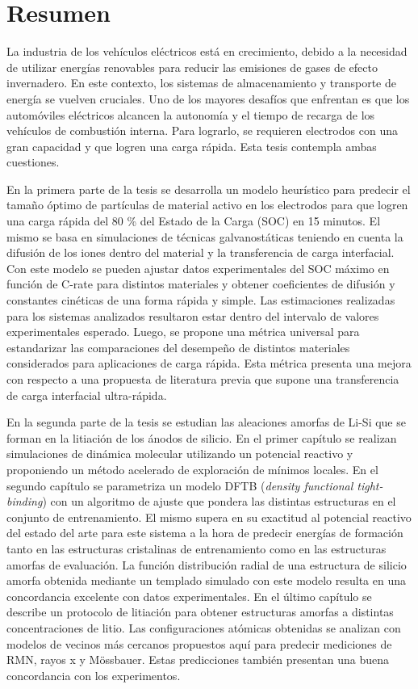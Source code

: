 \chapter{Resumen}

La industria de los vehículos eléctricos está en crecimiento, debido a la 
necesidad de utilizar energías renovables para reducir las emisiones de gases de 
efecto invernadero. En este contexto, los sistemas de almacenamiento y transporte 
de energía se vuelven cruciales. Uno de los mayores desafíos que enfrentan es que 
los automóviles eléctricos alcancen la autonomía y el tiempo de recarga de los 
vehículos de combustión interna. Para lograrlo, se requieren electrodos con una 
gran capacidad y que logren una carga rápida. Esta tesis contempla ambas 
cuestiones.

En la primera parte de la tesis se desarrolla un modelo heurístico para predecir 
el tamaño óptimo de partículas de material activo en los electrodos para que 
logren una carga rápida del 80 \% del Estado de la Carga (SOC) en 15 minutos. El 
mismo se basa en simulaciones de técnicas galvanostáticas teniendo en cuenta la 
difusión de los iones dentro del material y la transferencia de carga interfacial. 
Con este modelo se pueden ajustar datos experimentales del SOC máximo en función 
de C-rate para distintos materiales y obtener coeficientes de difusión y 
constantes cinéticas de una forma rápida y simple. Las estimaciones realizadas 
para los sistemas analizados resultaron estar dentro del intervalo de valores 
experimentales esperado. Luego, se propone una métrica universal para 
estandarizar las comparaciones del desempeño de distintos materiales considerados 
para aplicaciones de carga rápida. Esta métrica presenta una mejora con respecto 
a una propuesta de literatura previa que supone una transferencia de carga 
interfacial ultra-rápida.

En la segunda parte de la tesis se estudian las aleaciones amorfas de Li-Si que 
se forman en la litiación de los ánodos de silicio. En el primer capítulo se 
realizan simulaciones de dinámica molecular utilizando un potencial reactivo y 
proponiendo un método acelerado de exploración de mínimos locales. En el segundo 
capítulo se parametriza un modelo DFTB (\textit{density functional tight-binding})
con un algoritmo de ajuste que pondera las distintas estructuras en el conjunto 
de entrenamiento. El mismo supera en su exactitud al potencial reactivo del 
estado del arte para este sistema a la hora de predecir energías de formación 
tanto en las estructuras cristalinas de entrenamiento como en las estructuras 
amorfas de evaluación. La función distribución radial de una estructura de 
silicio amorfa obtenida mediante un templado simulado con este modelo resulta en 
una concordancia excelente con datos experimentales. En el último capítulo se 
describe un protocolo de litiación para obtener estructuras amorfas a distintas 
concentraciones de litio. Las configuraciones atómicas obtenidas se analizan con 
modelos de vecinos más cercanos propuestos aquí para predecir mediciones de RMN, 
rayos x y Mössbauer. Estas predicciones también presentan una buena concordancia 
con los experimentos.
